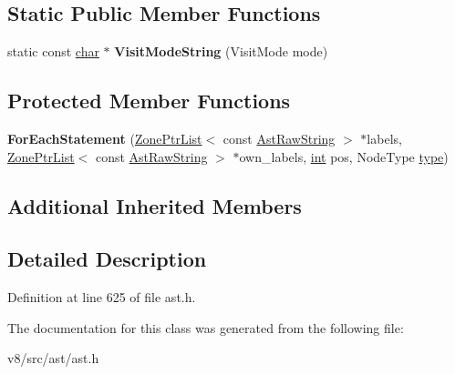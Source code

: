 \subsection*{Static Public Member Functions}
\begin{DoxyCompactItemize}
\item 
\mbox{\label{classv8_1_1internal_1_1ForEachStatement_a6b5cec4fb7fc8014471908926665e4f6}} 
static const \mbox{\hyperlink{classchar}{char}} $\ast$ {\bfseries Visit\+Mode\+String} (Visit\+Mode mode)
\end{DoxyCompactItemize}
\subsection*{Protected Member Functions}
\begin{DoxyCompactItemize}
\item 
\mbox{\label{classv8_1_1internal_1_1ForEachStatement_a962341675e1d070659d8a718ac0d317b}} 
{\bfseries For\+Each\+Statement} (\mbox{\hyperlink{classv8_1_1internal_1_1ZoneList}{Zone\+Ptr\+List}}$<$ const \mbox{\hyperlink{classv8_1_1internal_1_1AstRawString}{Ast\+Raw\+String}} $>$ $\ast$labels, \mbox{\hyperlink{classv8_1_1internal_1_1ZoneList}{Zone\+Ptr\+List}}$<$ const \mbox{\hyperlink{classv8_1_1internal_1_1AstRawString}{Ast\+Raw\+String}} $>$ $\ast$own\+\_\+labels, \mbox{\hyperlink{classint}{int}} pos, Node\+Type \mbox{\hyperlink{classstd_1_1conditional_1_1type}{type}})
\end{DoxyCompactItemize}
\subsection*{Additional Inherited Members}


\subsection{Detailed Description}


Definition at line 625 of file ast.\+h.



The documentation for this class was generated from the following file\+:\begin{DoxyCompactItemize}
\item 
v8/src/ast/ast.\+h\end{DoxyCompactItemize}
